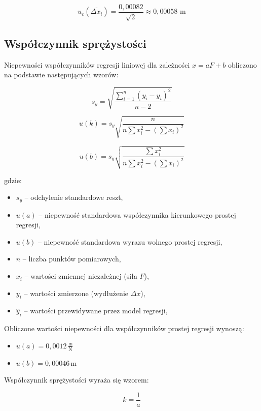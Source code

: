 \documentclass[a4paper,12pt]{article}
\begin{document}
\begin{equation*}
    u_c(\overline{\Delta x_i}) = \frac{0,00082}{\sqrt{2}} \approx 0,00058 \text{ m}
\end{equation*}


\subsection{Współczynnik sprężystości}

Niepewności współczynników regresji liniowej dla zależności $x = a F + b$ obliczono na podstawie następujących wzorów:

\[
    s_y = \sqrt{\frac{\sum_{i=1}^{n} (y_i - \hat{y}_i)^2}{n-2}}
\]

\[
    u(k) = s_y \sqrt{\frac{n}{n \sum x_i^2 - \left( \sum x_i \right)^2}}
\]

\[
    u(b) = s_y \sqrt{\frac{\sum x_i^2}{n \sum x_i^2 - \left( \sum x_i \right)^2}}
\]

gdzie:

\begin{itemize}
    \setlength{\itemsep}{0em}
    \item $s_y$ -- odchylenie standardowe reszt,
    \item $u(a)$ -- niepewność standardowa współczynnika kierunkowego prostej regresji,
    \item $u(b)$ -- niepewność standardowa wyrazu wolnego prostej regresji,
    \item $n$ -- liczba punktów pomiarowych,
    \item $x_i$ -- wartości zmiennej niezależnej (siła $F$),
    \item $y_i$ -- wartości zmierzone (wydłużenie $\Delta x$),
    \item $\hat{y}_i$ -- wartości przewidywane przez model regresji,
\end{itemize}

Obliczone wartości niepewności dla współczynników prostej regresji wynoszą:

\begin{itemize}
    \setlength{\itemsep}{0em}
    \item $u(a) = 0,0012\,\frac{\text{m}}{\text{N}}$
    \item $u(b) = 0,00046\,\text{m}$
\end{itemize}

Współczynnik sprężystości wyraża się wzorem:

\begin{equation*}
    k = \frac{1}{a}
\end{equation*}
\end{document}
